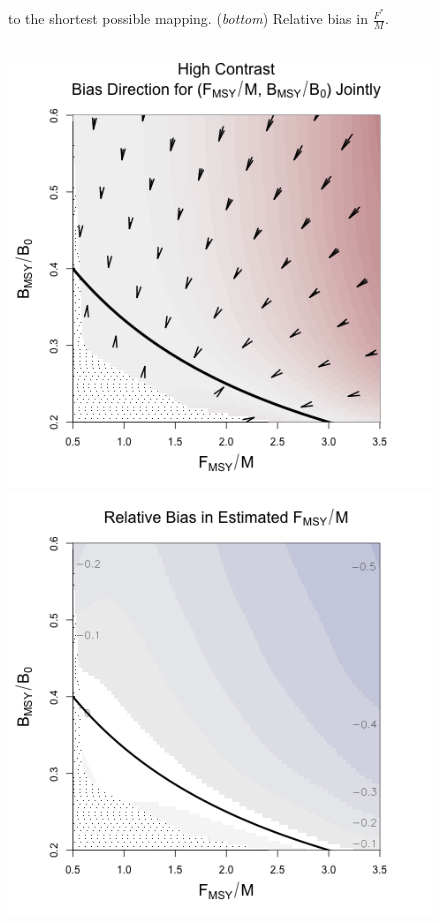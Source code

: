 \begin{figure}[h!]
\begin{minipage}[h!]{0.46\textwidth}
{to the shortest possible mapping. (\emph{bottom}) Relative bias in $\frac{F^*}{M}$.
}
$~$\\$~$\\
\end{minipage}
\begin{minipage}[h!]{0.44\textwidth}
\vspace{-0.8cm}
\hspace*{-0.1cm}
\includegraphics[width=1.2\textwidth]{../gpBias/directionalBiasSchnuteSubTitleExpT45N150Wide.png}\\
\hspace*{-0.1cm}
\includegraphics[width=1.2\textwidth]{../gpBias/fMSYRelBiasSchnuteExpT45N150Wide.png}

\end{minipage}
\end{figure}
